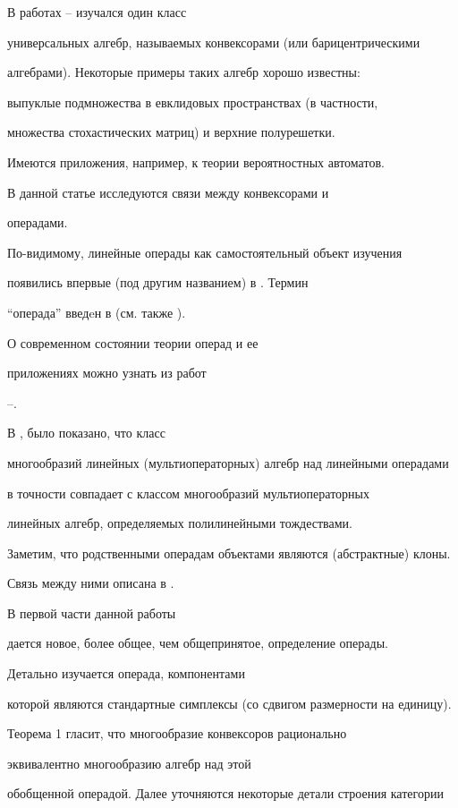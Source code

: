 В работах \cite{Sc1}--\cite{Sc3} изучался один класс


универсальных алгебр, называемых конвексорами (или барицентрическими


алгебрами). Некоторые примеры таких алгебр хорошо известны:


выпуклые подмножества в евклидовых пространствах (в частности,


множества стохастических матриц) и верхние полурешетки.


Имеются приложения, например, к теории вероятностных автоматов.


В данной статье исследуются связи между конвексорами и


операдами.


По-видимому, линейные операды как самостоятельный объект изучения


появились впервые (под другим названием) в \cite{Art}. Термин


``операда'' введeн в \cite{May} (см. также \cite{BF}).


О современном состоянии теории операд и ее


приложениях можно узнать из работ


\cite{GK}--\cite{Smir}.


В \cite{T2}, \cite{T} было показано, что класс


многообразий линейных (мультиоператорных) алгебр над линейными операдами


в точности совпадает с классом многообразий мультиоператорных


линейных алгебр, определяемых полилинейными тождествами.


Заметим, что родственными операдам объектами являются (абстрактные) клоны.


Связь между ними описана в \cite{TCl}.





В первой части данной работы


дается новое, более общее, чем общепринятое, определение операды.


Детально изучается операда, компонентами


которой являются стандартные симплексы (со сдвигом размерности на единицу).


Теорема 1 гласит, что многообразие конвексоров рационально


эквивалентно многообразию алгебр над этой


обобщенной операдой. Далее уточняются некоторые детали строения категории



